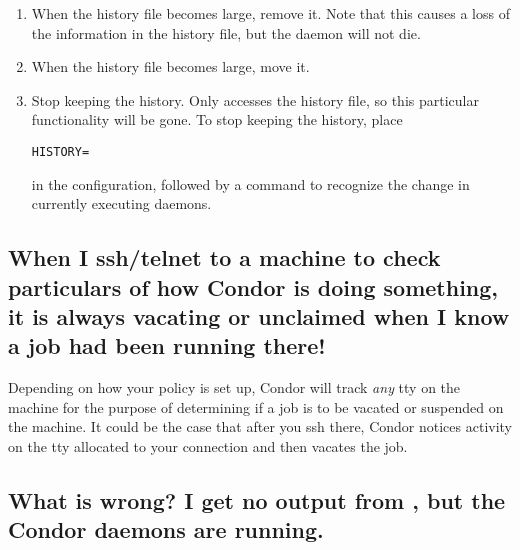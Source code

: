 \begin{enumerate}
\item When the history file becomes large, remove it.
Note that this causes a loss of the information in the history file,
but the  daemon will not die.
\item When the history file becomes large, move it.
\item Stop keeping the history.
Only  accesses the history file, 
so this particular functionality will be gone.
To stop keeping the history, place
\begin{verbatim}
HISTORY=
\end{verbatim}
in the configuration,
followed by a  command to recognize the change in
currently executing daemons.
\end{enumerate}

\subsection*{When I ssh/telnet to a machine to check particulars of how
Condor is doing something, it is always vacating or unclaimed when I
know a job had been running there!}

Depending on how your policy is set up, Condor will track \emph{any} tty
on the machine for the purpose of determining if a job is to be vacated
or suspended on the machine. It could be the case that after you ssh
there, Condor notices activity on the tty allocated to your connection
and then vacates the job.

\subsection*{What is wrong? I get no output from , but the Condor daemons are running.}

